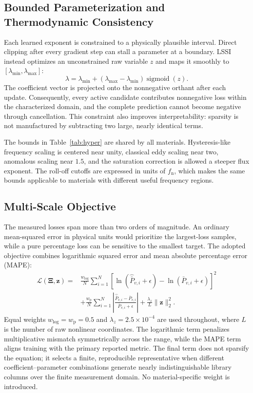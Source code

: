 \documentclass[lettersize,journal]{IEEEtran}
\newcommand{\vect}[1]{\boldsymbol{#1}}
\begin{document}
\subsection{Bounded Parameterization and Thermodynamic Consistency}

Each learned exponent is constrained to a physically plausible interval. Direct clipping after every gradient step can stall a parameter at a boundary. LSSI instead optimizes an unconstrained raw variable $z$ and maps it smoothly to $[\lambda_{\min},\lambda_{\max}]$:
\begin{equation}
 \lambda=\lambda_{\min}+(\lambda_{\max}-\lambda_{\min})\operatorname{sigmoid}(z).
 \label{eq:sigmoid}
\end{equation}
The coefficient vector is projected onto the nonnegative orthant after each update. Consequently, every active candidate contributes nonnegative loss within the characterized domain, and the complete prediction cannot become negative through cancellation. This constraint also improves interpretability: sparsity is not manufactured by subtracting two large, nearly identical terms.

The bounds in Table~\ref{tab:hyper} are shared by all materials. Hysteresis-like frequency scaling is centered near unity, classical eddy scaling near two, anomalous scaling near $1.5$, and the saturation correction is allowed a steeper flux exponent. The roll-off cutoffs are expressed in units of $f_{\mathrm{n}}$, which makes the same bounds applicable to materials with different useful frequency regions.

\subsection{Multi-Scale Objective}

The measured losses span more than two orders of magnitude. An ordinary mean-squared error in physical units would prioritize the largest-loss samples, while a pure percentage loss can be sensitive to the smallest target. The adopted objective combines logarithmic squared error and mean absolute percentage error (MAPE):
\begin{align}
 \mathcal{L}(\vect{\Xi},\vect{z})={}&\frac{w_{\log}}{N}\sum_{i=1}^{N}
 \left[\ln(\widehat{\bar P}_{v,i}+\epsilon)-\ln(\bar P_{v,i}+\epsilon)\right]^2 \nonumber\\
 &+\frac{w_{\mathrm{p}}}{N}\sum_{i=1}^{N}
 \left|\frac{\widehat{\bar P}_{v,i}-\bar P_{v,i}}{\bar P_{v,i}+\epsilon}\right|
 +\frac{\lambda_z}{L}\lVert\vect{z}\rVert_2^2.
 \label{eq:loss}
\end{align}
Equal weights $w_{\log}=w_{\mathrm{p}}=0.5$ and $\lambda_z=2.5\times10^{-4}$ are used throughout, where $L$ is the number of raw nonlinear coordinates. The logarithmic term penalizes multiplicative mismatch symmetrically across the range, while the MAPE term aligns training with the primary reported metric. The final term does not sparsify the equation; it selects a finite, reproducible representative when different coefficient--parameter combinations generate nearly indistinguishable library columns over the finite measurement domain. No material-specific weight is introduced.
\end{document}
